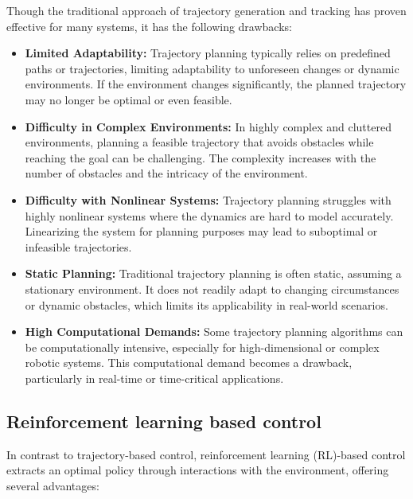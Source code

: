 Though the traditional approach of trajectory generation and tracking has proven effective for many systems, it has the following drawbacks:
\begin{itemize}
    \item \textbf{Limited Adaptability:}
    Trajectory planning typically relies on predefined paths or trajectories, limiting adaptability to unforeseen changes or dynamic environments. If the environment changes significantly, the planned trajectory may no longer be optimal or even feasible.
    
    \item \textbf{Difficulty in Complex Environments:}
    In highly complex and cluttered environments, planning a feasible trajectory that avoids obstacles while reaching the goal can be challenging. The complexity increases with the number of obstacles and the intricacy of the environment.
    
    \item \textbf{Difficulty with Nonlinear Systems:}
    Trajectory planning struggles with highly nonlinear systems where the dynamics are hard to model accurately. Linearizing the system for planning purposes may lead to suboptimal or infeasible trajectories.
    
    \item \textbf{Static Planning:}
    Traditional trajectory planning is often static, assuming a stationary environment. It does not readily adapt to changing circumstances or dynamic obstacles, which limits its applicability in real-world scenarios.
    
    \item \textbf{High Computational Demands:}
    Some trajectory planning algorithms can be computationally intensive, especially for high-dimensional or complex robotic systems. This computational demand becomes a drawback, particularly in real-time or time-critical applications.
\end{itemize}

\subsection{Reinforcement learning based control}
In contrast to trajectory-based control, reinforcement learning (RL)-based control extracts an optimal policy through interactions with the environment, offering several advantages:

